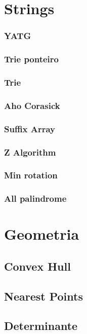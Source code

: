 \documentclass[a4paper,12pt]{article}
\newcommand\includes[4]{
   \subsection{#2}
   
}
\newcommand\includess[4]{
   \subsubsection{#2}
   
}
\begin{document}
\begin{multicols}{2}
\section{Strings}
\includess{c++}{YATG}{strings}{YATG.cpp}
\includess{c++}{Trie ponteiro}{strings}{trie_ponteiro.cpp}
\includess{c++}{Trie}{strings}{trieXor.cpp}
\includess{c++}{Aho Corasick}{strings}{aho-corasick.cpp}
\includess{c++}{Suffix Array}{strings}{suffix_array.cpp}
\includess{c++}{Z Algorithm}{strings}{z_algo.cpp}
\includess{c++}{Min rotation}{strings}{min_rot.cpp}
\includess{c++}{All palindrome}{strings}{all_palindrome.cpp}

\section{Geometria}
\includes{c++}{Convex Hull}{geometria}{convexhull.cpp}
\includes{c++}{Nearest Points}{geometria}{near.cpp}
\includes{c++}{Determinante}{geometria}{det.cpp}


\end{multicols}
\end{document}
